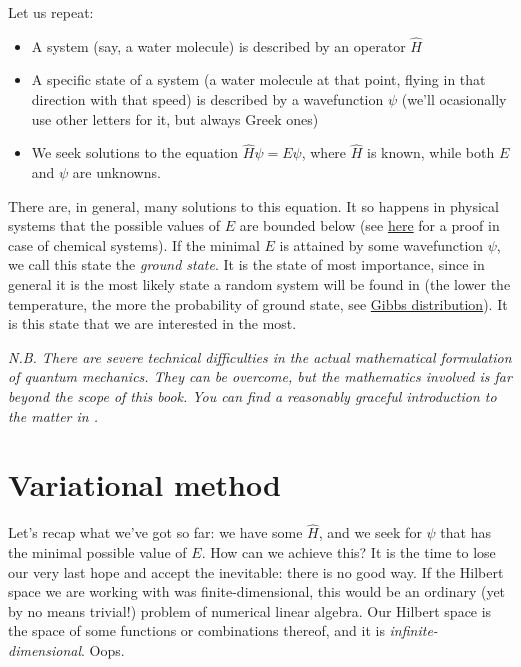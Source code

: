 \documentclass{article}
\begin{document}
Let us repeat:
\begin{itemize}
\item A system (say, a water molecule) is described by an operator \(\hat H\)
\item A specific state of a system (a water molecule at that point, flying in that direction with that speed) is described by a wavefunction \(\psi\) (we'll ocasionally use other letters for it, but always Greek ones)
\item We seek solutions to the equation \(\hat H \psi = E \psi\), where \(\hat H\) is known, while both \(E\) and \(\psi\) are unknowns. 
\end{itemize}

There are, in general, many solutions to this equation. It so happens in physical systems that the possible values of \(E\) are bounded below (see \href{https://www.themathcitadel.com/energy-levels-of-molecules-are-bounded-below/}{here} for a proof in case of chemical systems). If the minimal \(E\) is attained by some wavefunction \(\psi\), we call this state the \textit{ground state}. It is the state of most importance, since in general it is the most likely state a random system will be found in (the lower the temperature, the more the probability of ground state, see \href{https://en.wikipedia.org/wiki/Boltzmann_distribution}{Gibbs distribution}). It is this state that we are interested in the most.

\textit{N.B. There are severe technical difficulties in the actual mathematical formulation of quantum mechanics. They can be overcome, but the mathematics involved is far beyond the scope of this book. You can find a reasonably graceful introduction to the matter in \cite{ref:hall}.}

\newpage

\section{Variational method} \label{sec:var}

Let's recap what we've got so far: we have some \(\hat H\), and we seek for \(\psi\) that has the minimal possible value of \(E\). How can we achieve this? It is the time to lose our very last hope and accept the inevitable: there is no good way. If the Hilbert space we are working with was finite-dimensional, this would be an ordinary (yet by no means trivial!) problem of numerical linear algebra. Our Hilbert space is the space of some functions or combinations thereof, and it is \textit{infinite-dimensional}. Oops.
\end{document}
